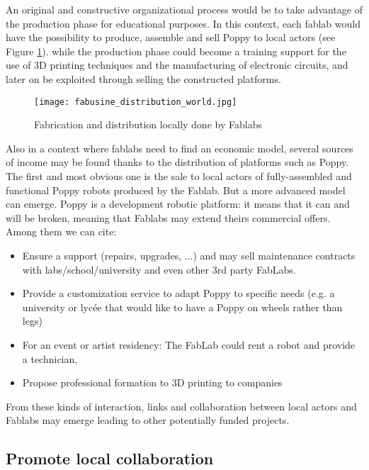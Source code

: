 An original and constructive organizational process would be to take advantage of the production phase for educational purposes. In this context, each fablab would have the possibility to produce, assemble and sell Poppy to local actors (see Figure \ref{fig:world_fab}). while the production phase could become a training support for the use of 3D printing techniques and the manufacturing of electronic circuits, and later on be exploited through selling the constructed platforms.

\begin{figure}[tb]
    \begin{center}
        \texttt{[image: fabusine\_distribution\_world.jpg]}
    \end{center}
    \caption{Fabrication and distribution locally done by Fablabs}
    \label{fig:world_fab}
\end{figure}


Also in a context where fablabs need to find an economic model, several sources of income may be found thanks to the distribution of platforms such as Poppy. The first and most obvious one is the sale to local actors of fully-assembled and functional Poppy robots produced by the Fablab. But a more advanced model can emerge. Poppy is a development robotic platform: it means that it can and will be broken, meaning that Fablabs may extend theirs commercial offers. Among them we can cite:

\begin{itemize}
    \item Ensure a support (repairs, upgrades, ...) and may sell maintenance contracts with labs/school/university and even other 3rd party FabLabs.
    \item Provide a customization service to adapt Poppy to specific needs (e.g. a university or lycée that would like to have a Poppy on wheels rather than legs)
    \item For an event or artist residency: The FabLab could rent a robot and provide a technician,
    \item Propose professional formation to 3D printing to companies
\end{itemize}

From these kinds of interaction, links and collaboration between local actors and Fablabs may emerge leading to other potentially funded projects.

\subsection{Promote local collaboration} %

